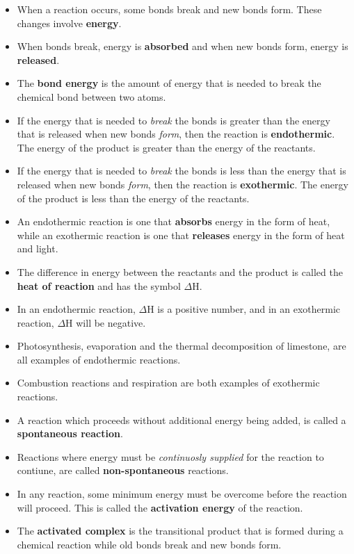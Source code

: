
\begin{itemize}
\item{When a reaction occurs, some bonds break and new bonds form. These changes involve \textbf{energy}.}
\item{When bonds break, energy is \textbf{absorbed} and when new bonds form, energy is \textbf{released}.}
\item{The \textbf{bond energy} is the amount of energy that is needed to break the chemical bond between two atoms.}
\item{If the energy that is needed to \textit{break} the bonds is greater than the energy that is released when new bonds \textit{form}, then the reaction is \textbf{endothermic}. The energy of the product is greater than the energy of the reactants.}
\item{If the energy that is needed to \textit{break} the bonds is less than the energy that is released when new bonds \textit{form}, then the reaction is \textbf{exothermic}. The energy of the product is less than the energy of the reactants.}
\item{An endothermic reaction is one that \textbf{absorbs} energy in the form of heat, while an exothermic reaction is one that \textbf{releases} energy in the form of heat and light.}
\item{The difference in energy between the reactants and the product is called the \textbf{heat of reaction} and has the symbol $\Delta$H.}
\item{In an endothermic reaction, $\Delta$H is a positive number, and in an exothermic reaction, $\Delta$H will be negative.}
\item{Photosynthesis, evaporation and the thermal decomposition of limestone, are all examples of endothermic reactions.}
\item{Combustion reactions and respiration are both examples of exothermic reactions.}
\item{A reaction which proceeds without additional energy being added, is called a \textbf{spontaneous reaction}.}
\item{Reactions where energy must be \textit{continuosly supplied} for the reaction to contiune, are called \textbf{non-spontaneous} reactions.}
\item{In any reaction, some minimum energy must be overcome before the reaction will proceed. This is called the \textbf{activation energy} of the reaction.}
\item{The \textbf{activated complex} is the transitional product that is formed during a chemical reaction while old bonds break and new bonds form.}
\end{itemize}

